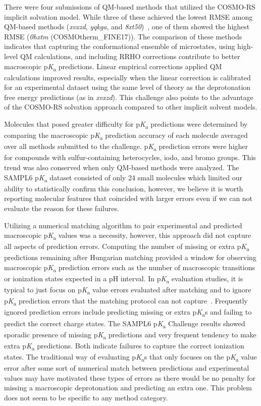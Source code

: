 \documentclass[9pt,lineno,final]{elife}
\newcommand{\pKa}{p\textit{K}\textsubscript{a}}
\begin{document}
There were four submissions of QM-based methods that utilized the COSMO-RS implicit solvation model. 
While three of these achieved the lowest RMSE among QM-based methods (\textit{xvxzd}, \textit{yqkga}, and \textit{8xt50})~\citep{Pracht:2018:J.Comput.AidedMol.Des.}, one of them showed the highest RMSE (\textit{0hxtm} (COSMOtherm\_FINE17)). 
The comparison of these methods indicates that capturing the conformational ensemble of microstates, using high-level QM calculations, and including RRHO corrections contribute to better macroscopic \pKa{} predictions.
Linear empirical corrections applied QM calculations improved results, especially when the linear correction is calibrated for an experimental dataset using the same level of theory as the deprotonation free energy predictions (as in \textit{xvxzd}).
This challenge also points to the advantage of the COSMO-RS solvation approach compared to other implicit solvent models.

Molecules that posed greater difficulty for \pKa{} predictions were determined by comparing the macroscopic \pKa{} prediction accuracy of each molecule averaged over all methods submitted to the challenge. 
\pKa{} prediction errors were higher for compounds with sulfur-containing heterocycles, iodo, and bromo groups. 
This trend was also conserved when only QM-based methods were analyzed. 
The SAMPL6 \pKa{} dataset consisted of only 24 small molecules which limited our ability to statistically confirm this conclusion, however, we believe it is worth reporting molecular features that coincided with larger errors even if we can not evaluate the reason for these failures. 

Utilizing a numerical matching algorithm to pair experimental and predicted macroscopic \pKa{} values was a necessity, however, this approach did not capture all aspects of prediction errors. 
Computing the number of missing or extra \pKa{} predictions remaining after Hungarian matching provided a window for observing macroscopic \pKa{} prediction errors such as the number of macroscopic transitions or ionization states expected in a pH interval. 
In \pKa{} evaluation studies, it is typical to just focus on \pKa{} value errors evaluated after matching and to ignore \pKa{} prediction errors that the matching protocol can not capture~\citep{Balogh:2012:J.Pharm.Biomed.Anal.a, Settimo:2014:Pharm.Res.a, Meloun:2007:Anal.Bioanal.Chem., Liao:2009:J.Chem.Inf.Model., Manchester:2010:J.Chem.Inf.Model.}. 
Frequently ignored prediction errors include predicting missing or extra \pKa{}s and failing to predict the correct charge states. 
The SAMPL6 \pKa{} Challenge results showed sporadic presence of missing \pKa{} predictions and very frequent tendency to make extra \pKa{} predictions. 
Both indicate failures to capture the correct ionization states. 
The traditional way of evaluating \pKa{}s that only focuses on the \pKa{} value error after some sort of numerical match between predictions and experimental values may have motivated these types of errors as there would be no penalty for missing a macroscopic deprotonation and predicting an extra one. 
This problem does not seem to be specific to any method category.
\end{document}
